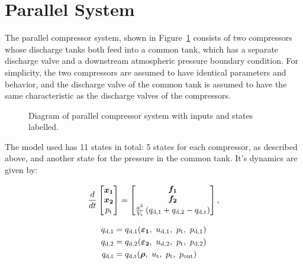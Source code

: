 \section{Parallel System}
\label{sec:mod:parallel}

The parallel compressor system, shown in Figure~\ref{fig:mod:parallel} consists of two compressors whose discharge tanks both feed into a common tank, which has a separate discharge valve and a downstream atmospheric pressure boundary condition.
For simplicity, the two compressors are assumed to have identical parameters and behavior, and the discharge valve of the common tank is assumed to have the same characteristic as the discharge valves of the compressors.

\begin{figure}
  \centering
  
  \caption{Diagram of parallel compressor system with inputs and states labelled.}
  \label{fig:mod:parallel}
\end{figure}



The model used has 11 states in total: 5 states for each compressor, as described above, and another state for the pressure in the common tank. It's dynamics are given by:

\begin{equation}
  \frac{d}{dt}\begin{bmatrix}
    \bm{x_1}\\
    \bm{x_2}\\
    p_\text{t}
  \end{bmatrix}
  =
  \begin{bmatrix}
    \bm{f_1}\\
    \bm{f_2}\\
    \frac{a^2}{V_\text{t}}\left(q_{\text{d,1}}+q_{\text{d,2}}-q_{\text{d,t}}\right)
  \end{bmatrix},
\end{equation}

\begin{equation}
  \begin{split}
    q_{\text{d,1}} & = q_{\text{d,1}}(\vc{\varepsilon_1},\ u_{\text{d},1},\ p_{\text{t}},\ p_{\text{d,1}})\\
    q_{\text{d,2}} & = q_{\text{d,2}}(\vc{\varepsilon_2},\ u_{\text{\text{d}},2},\ p_{\text{t}},\ p_{\text{d,2}})\\
    q_{\text{d,t}} & = q_{\text{d,t}}(\vc{\rho},\ u_{\text{t}},\ p_\text{t},\ p_{\text{out}})
  \end{split}
\end{equation}

